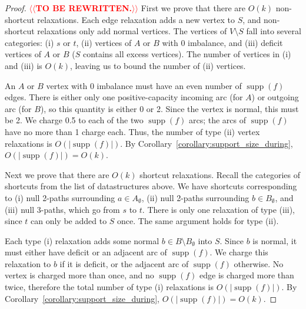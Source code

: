 \documentclass[a4paper,UKenglish]{socg-lipics-v2018}
\makeatletter
\def\note#1{\textcolor{red}{{#1}}}
\def\supp{\operatorname{supp}}
\theoremstyle{plain}
\numberwithin{figure}{section}
\def\n@te#1{\textsf{\boldmath \textbf{$\langle\!\langle$#1$\rangle\!\rangle$}}\leavevmode}
\def\note#1{\textcolor{red}{\n@te{#1}}}
\makeatother
\begin{document}
\begin{proof}
\note{TO BE REWRITTEN.}
First we prove that there are $O(k)$ non-shortcut relaxations.
%
Each edge relaxation adds a new vertex to $S$, and non-shortcut relaxations
only add normal vertices.
The vertices of $V \setminus S$ fall into several categories:
(i) $s$ or $t$, (ii) vertices of $A$ or $B$ with 0 imbalance, and (iii)
deficit vertices of $A$ or $B$ ($S$ contains all excess vertices).
The number of vertices in (i) and (iii) is $O(k)$, leaving us to bound the
number of (ii) vertices.

An $A$ or $B$ vertex with 0 imbalance must have an even number of $\supp(f)$
edges.
There is either only one positive-capacity incoming arc (for $A$) or outgoing
arc (for $B$), so this quantity is either 0 or 2.
Since the vertex is normal, this must be 2.
We charge 0.5 to each of the two $\supp(f)$ arcs; the arcs of $\supp(f)$
have no more than 1 charge each.
Thus, the number of type (ii) vertex relaxations is $O(|\supp(f)|)$.
By Corollary~\ref{corollary:support_size_during}, $O(|\supp(f)|) = O(k)$.

Next we prove that there are $O(k)$ shortcut relaxations.
%
Recall the categories of shortcuts from the list of datastructures above.
We have shortcuts corresponding to (i) null 2-paths surrounding
$a \in A_\emptyset$, (ii) null 2-paths surrounding $b \in B_\emptyset$, and
(iii) null 3-paths, which go from $s$ to $t$.
%
There is only one relaxation of type (iii), since $t$ can only be added to $S$
once.
The same argument holds for type (ii).

Each type (i) relaxation adds some normal $b \in B \setminus B_\emptyset$
into $S$.
Since $b$ is normal, it must either have deficit or an adjacent arc of
$\supp(f)$.
We charge this relaxation to $b$ if it is deficit, or the adjacent arc of
$\supp(f)$ otherwise.
No vertex is charged more than once, and no $\supp(f)$ edge is charged more
than twice, therefore the total number of type (i) relaxations is
$O(|\supp(f)|)$.
By Corollary~\ref{corollary:support_size_during}, $O(|\supp(f)|) = O(k)$.
\end{proof}
\end{document}
